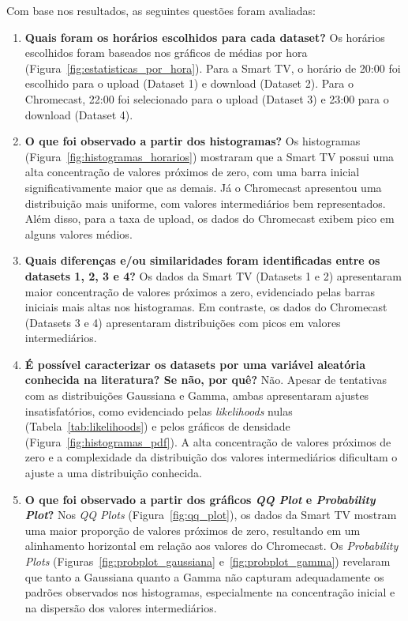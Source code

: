 Com base nos resultados, as seguintes questões foram avaliadas:
\begin{enumerate}
    \item \textbf{Quais foram os horários escolhidos para cada dataset?}  
    Os horários escolhidos foram baseados nos gráficos de médias por hora (Figura~\ref{fig:estatisticas_por_hora}). Para a Smart TV, o horário de 20:00 foi escolhido para o upload (Dataset 1) e download (Dataset 2). Para o Chromecast, 22:00 foi selecionado para o upload (Dataset 3) e 23:00 para o download (Dataset 4).

    \item \textbf{O que foi observado a partir dos histogramas?}  
    Os histogramas (Figura~\ref{fig:histogramas_horarios}) mostraram que a Smart TV possui uma alta concentração de valores próximos de zero, com uma barra inicial significativamente maior que as demais. Já o Chromecast apresentou uma distribuição mais uniforme, com valores intermediários bem representados. Além disso, para a taxa de upload, os dados do Chromecast exibem pico em alguns valores médios.

    \item \textbf{Quais diferenças e/ou similaridades foram identificadas entre os datasets 1, 2, 3 e 4?}  
    Os dados da Smart TV (Datasets 1 e 2) apresentaram maior concentração de valores próximos a zero, evidenciado pelas barras iniciais mais altas nos histogramas. Em contraste, os dados do Chromecast (Datasets 3 e 4) apresentaram distribuições com picos em valores intermediários.

    \item \textbf{É possível caracterizar os datasets por uma variável aleatória conhecida na literatura? Se não, por quê?}  
    Não. Apesar de tentativas com as distribuições Gaussiana e Gamma, ambas apresentaram ajustes insatisfatórios, como evidenciado pelas \textit{likelihoods} nulas (Tabela~\ref{tab:likelihoods}) e pelos gráficos de densidade (Figura~\ref{fig:histogramas_pdf}). A alta concentração de valores próximos de zero e a complexidade da distribuição dos valores intermediários dificultam o ajuste a uma distribuição conhecida.

    \item \textbf{O que foi observado a partir dos gráficos \textit{QQ Plot} e \textit{Probability Plot}?}  
    Nos \textit{QQ Plots} (Figura~\ref{fig:qq_plot}), os dados da Smart TV mostram uma maior proporção de valores próximos de zero, resultando em um alinhamento horizontal em relação aos valores do Chromecast. Os \textit{Probability Plots} (Figuras~\ref{fig:probplot_gaussiana} e~\ref{fig:probplot_gamma}) revelaram que tanto a Gaussiana quanto a Gamma não capturam adequadamente os padrões observados nos histogramas, especialmente na concentração inicial e na dispersão dos valores intermediários.
\end{enumerate}
